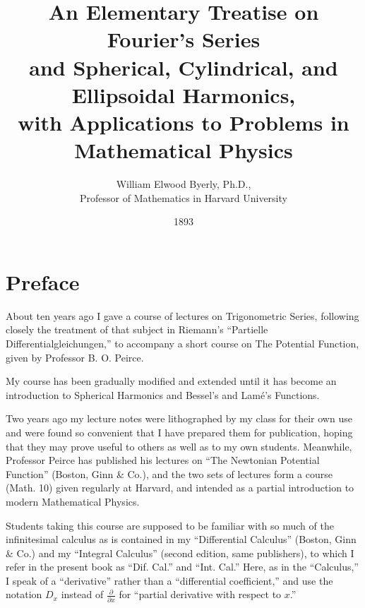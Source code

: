 \documentclass[oneside,12pt]{book}
\begin{document}
    
\frontmatter

\title{An Elementary Treatise on Fourier's Series\\and Spherical, Cylindrical, and Ellipsoidal Harmonics,\\with Applications to Problems in Mathematical Physics}
\author{William Elwood Byerly, Ph.D.,\\Professor of Mathematics in Harvard University}
\date{1893}
\maketitle

\chapter{Preface}
About ten years ago I gave a course of lectures on Trigonometric Series, following closely the treatment of that subject in Riemann's ``Partielle Differentialgleichungen,'' to accompany a short course on The Potential Function, given by Professor B. O. Peirce. \par 

My course has been gradually modified and extended until it has become an introduction to Spherical Harmonics and Bessel's and Lam\'e's Functions. \par 

Two years ago my lecture notes were lithographed by my class for their own use and were found so convenient that I have prepared them for publication, hoping that they may prove useful to others as well as to my own students. Meanwhile, Professor Peirce has published his lectures on ``The Newtonian Potential Function'' (Boston, Ginn \& Co.), and the two sets of lectures form a course (Math. 10) given regularly at Harvard, and intended as a partial introduction to modern Mathematical Physics. \par 

Students taking this course are supposed to be familiar with so much of the infinitesimal calculus as is contained in my ``Differential Calculus'' (Boston, Ginn \& Co.) and my ``Integral Calculus'' (second edition, same publishers), to which I refer in the present book as ``Dif. Cal.'' and ``Int. Cal.'' Here, as in the ``Calculus,'' I speak of a ``derivative'' rather than a ``differential coefficient,'' and use the notation $D_x$ instead of $\frac{\partial}{\partial x}$ for ``partial derivative with respect to $x$.'' \par 
\end{document}
